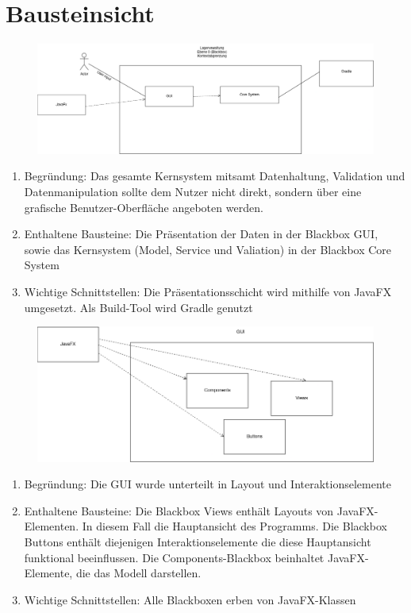 \section{Bausteinsicht}
\begin{figure}[H]
    \includegraphics[width=\linewidth]{images/bausteinsicht/Ebene1_Systemuebersicht.png}
    \label{fig:Systemuebersicht}
\end{figure}
\begin{enumerate}
    \item Begründung: Das gesamte Kernsystem mitsamt Datenhaltung, Validation und Datenmanipulation sollte dem Nutzer  nicht direkt, sondern über eine grafische Benutzer-Oberfläche angeboten werden.
    \item Enthaltene Bausteine: Die Präsentation der Daten in der Blackbox GUI, sowie das Kernsystem (Model, Service und Valiation) in der Blackbox Core System
    \item Wichtige Schnittstellen: Die Präsentationsschicht wird mithilfe von JavaFX umgesetzt. Als Build-Tool wird Gradle genutzt
\end{enumerate}
\begin{figure}[H]
    \includegraphics[width=\linewidth]{images/bausteinsicht/Ebene2_GUI.png}
    \label{fig:GUI}
\end{figure}
\begin{enumerate}
    \item Begründung: Die GUI wurde unterteilt in Layout und Interaktionselemente
    \item Enthaltene Bausteine: Die Blackbox Views enthält Layouts von JavaFX-Elementen. In diesem Fall die Hauptansicht des Programms. Die Blackbox Buttons enthält diejenigen Interaktionselemente die diese Hauptansicht funktional beeinflussen. Die Components-Blackbox beinhaltet JavaFX-Elemente, die das Modell darstellen.
    \item Wichtige Schnittstellen: Alle Blackboxen erben von JavaFX-Klassen
\end{enumerate}
